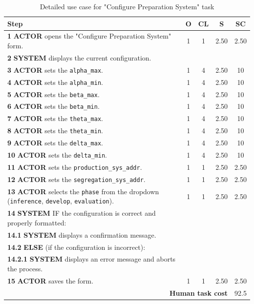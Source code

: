\begin{table}[H]
    \centering
    \begin{tabularx}{\textwidth}{|X|c|c|c|c|}
    \hline
    \textbf{Step} & \textbf{O} & \textbf{CL} & \textbf{S} & \textbf{SC} \\
    \hline
    \textbf{1} \textbf{ACTOR} opens the "Configure Preparation System" form. & 1 & 1 & 2.50 & 2.50 \\
    \hline
    \textbf{2} \textbf{SYSTEM} displays the current configuration. &  &  &  &  \\
    \hline
    \textbf{3} \textbf{ACTOR} sets the \texttt{alpha\_max}. & 1 & 4 & 2.50 & 10 \\
    \hline
    \textbf{4} \textbf{ACTOR} sets the \texttt{alpha\_min}. & 1 & 4 & 2.50 & 10 \\
    \hline
    \textbf{5} \textbf{ACTOR} sets the \texttt{beta\_max}. & 1 & 4 & 2.50 & 10 \\
    \hline
    \textbf{6} \textbf{ACTOR} sets the \texttt{beta\_min}. & 1 & 4 & 2.50 & 10 \\
    \hline
    \textbf{7} \textbf{ACTOR} sets the \texttt{theta\_max}. & 1 & 4 & 2.50 & 10 \\
    \hline
    \textbf{8} \textbf{ACTOR} sets the \texttt{theta\_min}. & 1 & 4 & 2.50 & 10 \\
    \hline
    \textbf{9} \textbf{ACTOR} sets the \texttt{delta\_max}. & 1 & 4 & 2.50 & 10 \\
    \hline
    \textbf{10} \textbf{ACTOR} sets the \texttt{delta\_min}. & 1 & 4 & 2.50 & 10 \\
    \hline
    \textbf{11} \textbf{ACTOR} sets the \texttt{production\_sys\_addr}. & 1 & 1 & 2.50 & 2.50 \\
    \hline
    \textbf{12} \textbf{ACTOR} sets the \texttt{segregation\_sys\_addr}. & 1 & 1 & 2.50 & 2.50 \\
    \hline
    \textbf{13} \textbf{ACTOR} selects the \texttt{phase} from the dropdown (\texttt{inference}, \texttt{develop}, \texttt{evaluation}). & 1 & 1 & 2.50 & 2.50 \\
    \hline
    \textbf{14} \textbf{SYSTEM} {IF} the configuration is correct and properly formatted: &  &  &  &  \\
    \hline
    \textbf{14.1} \textbf{SYSTEM} displays a confirmation message. & & & &  \\
    \hline
    \textbf{14.2} \textbf{ELSE} (if the configuration is incorrect): & & &  &  \\
    \hline
    \textbf{14.2.1} \textbf{SYSTEM} displays an error message and aborts the process. &  &  &  &  \\
    \hline
    \textbf{15} \textbf{ACTOR} saves the form. & 1 & 1 & 2.50 & 2.50 \\
    \hline
    \multicolumn{4}{|r|}{\textbf{Human task cost}} & 92.5 \\
    \hline
    \end{tabularx}
    \caption{Detailed use case for "Configure Preparation System" task}
    \label{table:configure_preparation_system}
\end{table}
